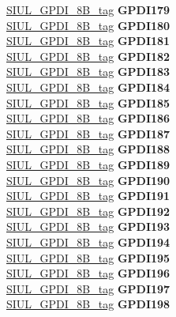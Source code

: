 \begin{DoxyCompactItemize}
\begin{tabbing}
\>\>\mbox{\hyperlink{unionSIUL__GPDI__8B__tag}{SIUL\_GPDI\_8B\_tag}} {\bfseries GPDI179}\\
\>\>\mbox{\hyperlink{unionSIUL__GPDI__8B__tag}{SIUL\_GPDI\_8B\_tag}} {\bfseries GPDI180}\\
\>\>\mbox{\hyperlink{unionSIUL__GPDI__8B__tag}{SIUL\_GPDI\_8B\_tag}} {\bfseries GPDI181}\\
\>\>\mbox{\hyperlink{unionSIUL__GPDI__8B__tag}{SIUL\_GPDI\_8B\_tag}} {\bfseries GPDI182}\\
\>\>\mbox{\hyperlink{unionSIUL__GPDI__8B__tag}{SIUL\_GPDI\_8B\_tag}} {\bfseries GPDI183}\\
\>\>\mbox{\hyperlink{unionSIUL__GPDI__8B__tag}{SIUL\_GPDI\_8B\_tag}} {\bfseries GPDI184}\\
\>\>\mbox{\hyperlink{unionSIUL__GPDI__8B__tag}{SIUL\_GPDI\_8B\_tag}} {\bfseries GPDI185}\\
\>\>\mbox{\hyperlink{unionSIUL__GPDI__8B__tag}{SIUL\_GPDI\_8B\_tag}} {\bfseries GPDI186}\\
\>\>\mbox{\hyperlink{unionSIUL__GPDI__8B__tag}{SIUL\_GPDI\_8B\_tag}} {\bfseries GPDI187}\\
\>\>\mbox{\hyperlink{unionSIUL__GPDI__8B__tag}{SIUL\_GPDI\_8B\_tag}} {\bfseries GPDI188}\\
\>\>\mbox{\hyperlink{unionSIUL__GPDI__8B__tag}{SIUL\_GPDI\_8B\_tag}} {\bfseries GPDI189}\\
\>\>\mbox{\hyperlink{unionSIUL__GPDI__8B__tag}{SIUL\_GPDI\_8B\_tag}} {\bfseries GPDI190}\\
\>\>\mbox{\hyperlink{unionSIUL__GPDI__8B__tag}{SIUL\_GPDI\_8B\_tag}} {\bfseries GPDI191}\\
\>\>\mbox{\hyperlink{unionSIUL__GPDI__8B__tag}{SIUL\_GPDI\_8B\_tag}} {\bfseries GPDI192}\\
\>\>\mbox{\hyperlink{unionSIUL__GPDI__8B__tag}{SIUL\_GPDI\_8B\_tag}} {\bfseries GPDI193}\\
\>\>\mbox{\hyperlink{unionSIUL__GPDI__8B__tag}{SIUL\_GPDI\_8B\_tag}} {\bfseries GPDI194}\\
\>\>\mbox{\hyperlink{unionSIUL__GPDI__8B__tag}{SIUL\_GPDI\_8B\_tag}} {\bfseries GPDI195}\\
\>\>\mbox{\hyperlink{unionSIUL__GPDI__8B__tag}{SIUL\_GPDI\_8B\_tag}} {\bfseries GPDI196}\\
\>\>\mbox{\hyperlink{unionSIUL__GPDI__8B__tag}{SIUL\_GPDI\_8B\_tag}} {\bfseries GPDI197}\\
\>\>\mbox{\hyperlink{unionSIUL__GPDI__8B__tag}{SIUL\_GPDI\_8B\_tag}} {\bfseries GPDI198}\\

\end{tabbing}
\end{DoxyCompactItemize}
